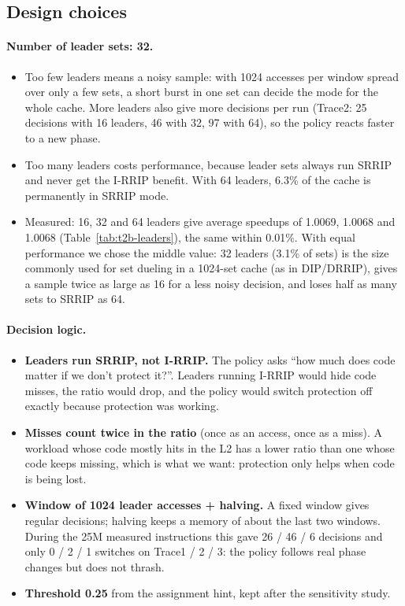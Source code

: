 \documentclass[11pt]{article}
\begin{document}
\subsection{Design choices}

\paragraph{Number of leader sets: 32.}
\begin{itemize}
  \item Too few leaders means a noisy sample: with 1024 accesses per window
        spread over only a few sets, a short burst in one set can decide the
        mode for the whole cache. More leaders also give more decisions per run
        (Trace2: 25 decisions with 16 leaders, 46 with 32, 97 with 64), so the
        policy reacts faster to a new phase.
  \item Too many leaders costs performance, because leader sets always run SRRIP
        and never get the I-RRIP benefit. With 64 leaders, 6.3\% of the cache is
        permanently in SRRIP mode.
  \item Measured: 16, 32 and 64 leaders give average speedups of 1.0069, 1.0068
        and 1.0068 (Table~\ref{tab:t2b-leaders}), the same within 0.01\%. With
        equal performance we chose the middle value: 32 leaders (3.1\% of sets)
        is the size commonly used for set dueling in a 1024-set cache (as in
        DIP/DRRIP), gives a sample twice as large as 16 for a less noisy
        decision, and loses half as many sets to SRRIP as 64.
\end{itemize}

\paragraph{Decision logic.}
\begin{itemize}
  \item \textbf{Leaders run SRRIP, not I-RRIP.} The policy asks ``how much does
        code matter if we don't protect it?''. Leaders running I-RRIP would hide
        code misses, the ratio would drop, and the policy would switch
        protection off exactly because protection was working.
  \item \textbf{Misses count twice in the ratio} (once as an access, once as a
        miss). A workload whose code mostly hits in the L2 has a lower ratio
        than one whose code keeps missing, which is what we want: protection
        only helps when code is being lost.
  \item \textbf{Window of 1024 leader accesses + halving.} A fixed window gives
        regular decisions; halving keeps a memory of about the last two windows.
        During the 25M measured instructions this gave 26 / 46 / 6 decisions and
        only 0 / 2 / 1 switches on Trace1 / 2 / 3: the policy follows real phase
        changes but does not thrash.
  \item \textbf{Threshold 0.25} from the assignment hint, kept after the
        sensitivity study.
\end{itemize}
\end{document}
